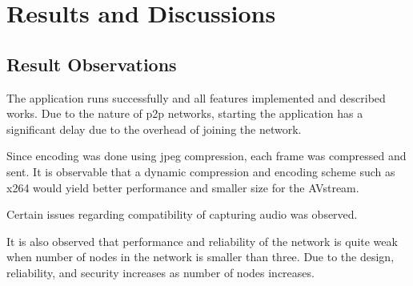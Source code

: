 \documentclass[a4paper,11pt]{article}
\begin{document}
\section{Results and Discussions}
\subsection{Result Observations}
The application runs successfully and all features implemented and described works. Due to the nature of p2p networks, starting the application has a significant delay due to the overhead of joining the network.

Since encoding was done using jpeg compression, each frame was compressed and sent. It is observable that a dynamic compression and encoding scheme such as x264 would yield better performance and smaller size for the AVstream.

Certain issues regarding compatibility of capturing audio was observed.

It is also observed that performance and reliability of the network is quite weak when number of nodes in the network is smaller than three. Due to the design, reliability, and security increases as number of nodes increases. 
\end{document}
